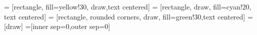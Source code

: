 \documentclass[12pt,oneside,openany,a4paper, %
english, %
masters-t, goldenblock]{usthesis}
\begin{document}

 = [rectangle, fill=yellow!30, draw,text centered]
 = [rectangle, draw, fill=cyan!20, text centered]
 = [rectangle, rounded corners, draw, fill=green!30,text centered]
 = [draw]
=[inner sep=0,outer sep=0]
\end{document}
